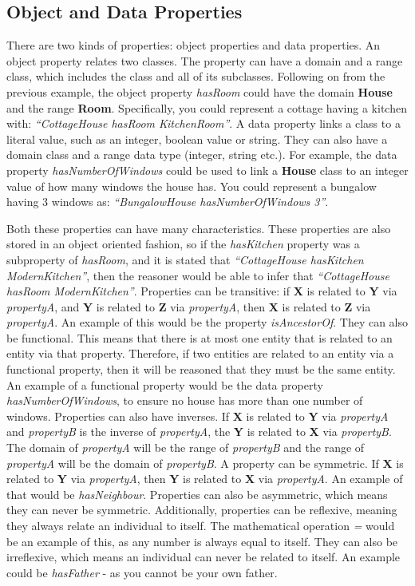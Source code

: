 \subsection{Object and Data Properties}

There are two kinds of properties: object properties and data properties. An object property relates two classes. The property can have a domain and a range class, which includes the class and all of its subclasses. Following on from the previous example, the object property \textit{hasRoom} could have the domain \textbf{House} and the range \textbf{Room}. Specifically, you could represent a cottage having a kitchen with: \textit{``CottageHouse hasRoom KitchenRoom''}. A data property links a class to a literal value, such as an integer, boolean value or string. They can also have a domain class and a range data type (integer, string etc.). For example, the data property \textit{hasNumberOfWindows} could be used to link a \textbf{House} class to an integer value of how many windows the house has. You could represent a bungalow having 3 windows as: \textit{``BungalowHouse hasNumberOfWindows 3''}. 

Both these properties can have many characteristics. These properties are also stored in an object oriented fashion, so if the \textit{hasKitchen} property was a subproperty of \textit{hasRoom}, and it is stated that \textit{``CottageHouse hasKitchen ModernKitchen''}, then the reasoner would be able to infer that \textit{``CottageHouse hasRoom ModernKitchen''}. Properties can be transitive: if \textbf{X} is related to \textbf{Y} via \textit{propertyA}, and \textbf{Y} is related to \textbf{Z} via \textit{propertyA}, then \textbf{X} is related to \textbf{Z} via \textit{propertyA}. An example of this would be the property \textit{isAncestorOf}. They can also be functional. This means that there is at most one entity that is related to an entity via that property. Therefore, if two entities are related to an entity via a functional property, then it will be reasoned that they must be the same entity. An example of a functional property would be the data property \textit{hasNumberOfWindows}, to ensure no house has more than one number of windows. Properties can also have inverses. If \textbf{X} is related to \textbf{Y} via \textit{propertyA} and \textit{propertyB} is the inverse of \textit{propertyA}, the \textbf{Y} is related to \textbf{X} via \textit{propertyB}. The domain of \textit{propertyA} will be the range of \textit{propertyB} and the range of \textit{propertyA} will be the domain of \textit{propertyB}. A property can be symmetric. If \textbf{X} is related to \textbf{Y} via \textit{propertyA}, then \textbf{Y} is related to \textbf{X} via \textit{propertyA}. An example of that would be \textit{hasNeighbour}. Properties can also be asymmetric, which means they can never be symmetric. Additionally, properties can be reflexive, meaning they always relate an individual to itself. The mathematical operation \textit{=} would be an example of this, as any number is always equal to itself. They can also be irreflexive, which means an individual can never be related to itself. An example could be \textit{hasFather} - as you cannot be your own father.

